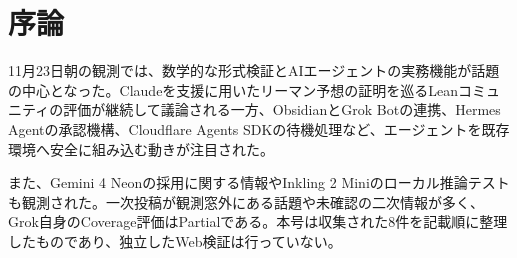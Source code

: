 \section{序論}
11月23日朝の観測では、数学的な形式検証とAIエージェントの実務機能が話題の中心となった。Claudeを支援に用いたリーマン予想の証明を巡るLeanコミュニティの評価が継続して議論される一方、ObsidianとGrok Botの連携、Hermes Agentの承認機構、Cloudflare Agents SDKの待機処理など、エージェントを既存環境へ安全に組み込む動きが注目された。

また、Gemini 4 Neonの採用に関する情報やInkling 2 Miniのローカル推論テストも観測された。一次投稿が観測窓外にある話題や未確認の二次情報が多く、Grok自身のCoverage評価はPartialである。本号は収集された8件を記載順に整理したものであり、独立したWeb検証は行っていない。
